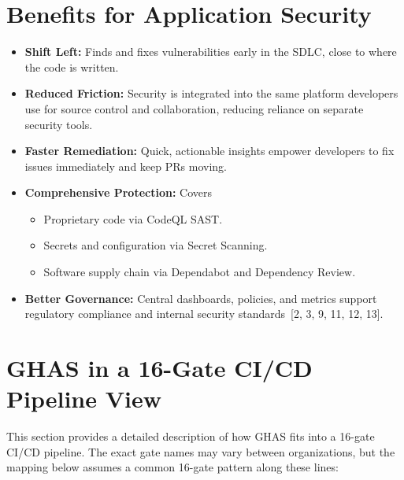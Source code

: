 \documentclass[11pt]{article}
\begin{document}
\section{Benefits for Application Security}

\begin{itemize}[leftmargin=*]
  \item \textbf{Shift Left:} Finds and fixes vulnerabilities early in the SDLC, close to where the code is written.
  \item \textbf{Reduced Friction:} Security is integrated into the same platform developers use for source control and collaboration, reducing reliance on separate security tools.
  \item \textbf{Faster Remediation:} Quick, actionable insights empower developers to fix issues immediately and keep PRs moving.
  \item \textbf{Comprehensive Protection:} Covers
    \begin{itemize}
      \item Proprietary code via CodeQL SAST.
      \item Secrets and configuration via Secret Scanning.
      \item Software supply chain via Dependabot and Dependency Review.
    \end{itemize}
  \item \textbf{Better Governance:} Central dashboards, policies, and metrics support regulatory compliance and internal security standards~[2, 3, 9, 11, 12, 13].
\end{itemize}

\section{GHAS in a 16-Gate CI/CD Pipeline View}

This section provides a detailed description of how GHAS fits into a 16-gate CI/CD pipeline. The exact gate names may vary between organizations, but the mapping below assumes a common 16-gate pattern along these lines:
\end{document}
